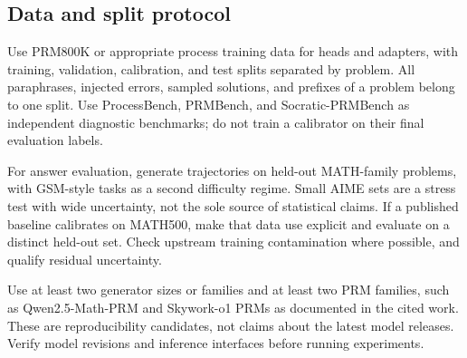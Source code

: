 \subsection{Data and split protocol}
Use PRM800K or appropriate process training data for heads and adapters, with
training, validation, calibration, and test splits separated by problem.
All paraphrases, injected
errors, sampled solutions, and prefixes of a problem belong to one split.
Use ProcessBench, PRMBench, and Socratic-PRMBench as independent diagnostic
benchmarks; do not train a calibrator on their final evaluation labels.

For answer evaluation, generate trajectories on held-out MATH-family problems,
with GSM-style tasks as a second difficulty regime. Small AIME sets are a
stress test with wide uncertainty, not the sole source of statistical claims.
If a published baseline calibrates on MATH500, make that data use explicit and
evaluate on a distinct held-out set. Check upstream training contamination where
possible, and qualify residual uncertainty.

Use at least two generator sizes or families and at least two PRM families,
such as Qwen2.5-Math-PRM and Skywork-o1 PRMs as documented in the cited work.
These are reproducibility candidates, not claims about the latest model releases.
Verify model revisions and inference interfaces before running experiments.

